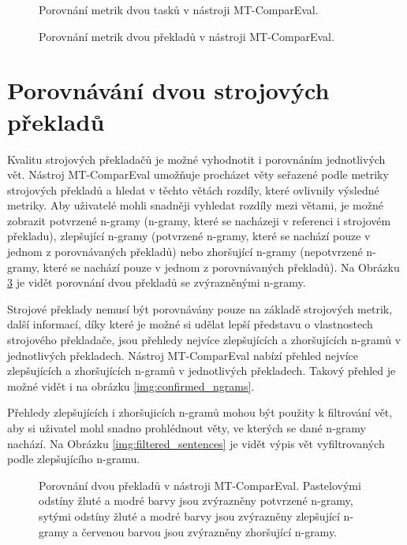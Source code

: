 \begin{figure}
	\caption{Porovnání metrik dvou tasků v nástroji MT-ComparEval.}
	\label{img:compare_metrics_tasks}
\end{figure}

\begin{figure}
	\caption{Porovnání metrik dvou překladů v nástroji MT-ComparEval.}
	\label{img:compare_metrics_sentences}
\end{figure}


\section{Porovnávání dvou strojových překladů}
Kvalitu strojových překladačů je možné vyhodnotit i porovnáním jednotlivých vět.
Nástroj MT-ComparEval umožňuje procházet věty seřazené podle metriky strojových překladů 
  a hledat v těchto větách rozdíly,
  které ovlivnily výsledné metriky.
Aby uživatelé mohli snadněji vyhledat rozdíly mezi větami,
  je možné zobrazit potvrzené n-gramy (n-gramy, které se nacházeji v referenci i strojovém překladu),
  zlepšující n-gramy (potvrzené n-gramy, které se nachází pouze v jednom z porovnávaných překladů)
  nebo zhoršující n-gramy (nepotvrzené n-gramy, které se nachází pouze v jednom z porovnávaných překladů).
Na Obrázku \ref{img:compare_sentences} je vidět porovnání dvou překladů se zvýrazněnými n-gramy.

Strojové překlady nemusí být porovnávány pouze na základě strojových metrik,
  další informací,
  díky které je možné si udělat lepší představu o vlastnostech strojového překladače,
  jsou přehledy nejvíce zlepšujících a zhoršujících n-gramů v jednotlivých překladech.
Nástroj MT-ComparEval nabízí přehled nejvíce zlepšujících a zhoršujících n-gramů
  v jednotlivých překladech.
Takový přehled je možné vidět i na obrázku \ref{img:confirmed_ngrams}.

Přehledy zlepšujících i zhoršujicích n-gramů mohou být použity k filtrování vět,
  aby si uživatel mohl snadno prohlédnout věty,
  ve kterých se dané n-gramy nachází.
Na Obrázku \ref{img:filtered_sentences} je vidět výpis vět vyfiltrovaných podle zlepšujícího n-gramu.

\begin{figure}
	\caption{
		Porovnání dvou překladů v nástroji MT-ComparEval.
		Pastelovými odstíny žluté a modré barvy jsou zvýrazněny potvrzené n-gramy,
		sytými odstíny žluté a modré barvy jsou zvýrazněny zlepšující n-gramy
		a červenou barvou jsou zvýrazněny zhoršující n-gramy.
	}
	\label{img:compare_sentences}
\end{figure}

